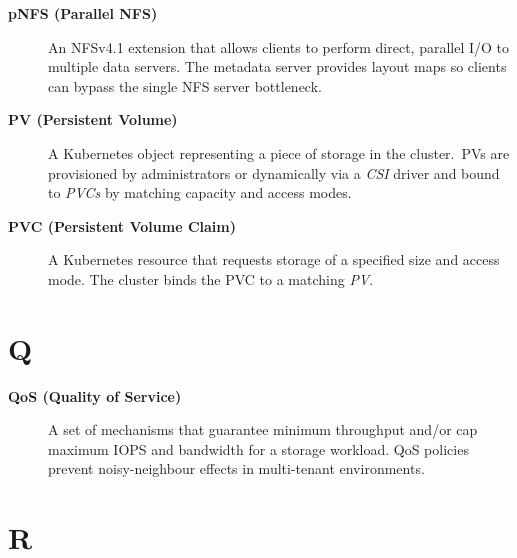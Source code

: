 \begin{description}

\item[\textbf{pNFS (Parallel NFS)}]
An NFSv4.1 extension that allows clients to perform direct, parallel I/O to
multiple data servers. The metadata server provides layout maps so clients
can bypass the single NFS server bottleneck.

\item[\textbf{PV (Persistent Volume)}]
A Kubernetes object representing a piece of storage in the cluster.\ PVs
are provisioned by administrators or dynamically via a \textit{CSI} driver
and bound to \textit{PVCs} by matching capacity and access modes.

\item[\textbf{PVC (Persistent Volume Claim)}]
A Kubernetes resource that requests storage of a specified size and access
mode. The cluster binds the PVC to a matching \textit{PV}.

\end{description}

\section*{Q}

\begin{description}

\item[\textbf{QoS (Quality of Service)}]
A set of mechanisms that guarantee minimum throughput and/or cap maximum IOPS
and bandwidth for a storage workload. QoS policies prevent noisy-neighbour
effects in multi-tenant environments.

\end{description}

\section*{R}

